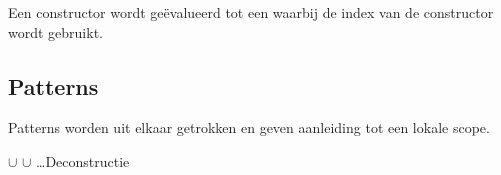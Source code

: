 \documentclass{article}
\begin{document}
Een constructor wordt ge\"evalueerd tot een  waarbij de index van de constructor wordt gebruikt.



\subsection{Patterns}

Patterns worden uit elkaar getrokken en geven aanleiding tot een lokale scope.


 {\perc {}$\cup$ \perc {} $\cup$ \ldots }{Deconstructie}
\end{document}
